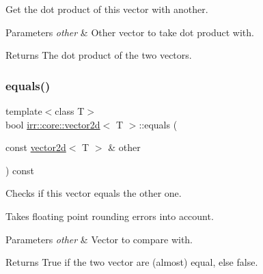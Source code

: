 Get the dot product of this vector with another. 


\begin{DoxyParams}{Parameters}
{\em other} & Other vector to take dot product with. \\
\hline
\end{DoxyParams}
\begin{DoxyReturn}{Returns}
The dot product of the two vectors. 
\end{DoxyReturn}
\mbox{\label{classirr_1_1core_1_1vector2d_a9b04601d982c880ed599b5bb16cd86a7}} 
\subsubsection{\texorpdfstring{equals()}{equals()}\hspace{0.1cm}{\footnotesize\ttfamily [1/2]}}
{\footnotesize\ttfamily template$<$class T$>$ \\
bool \hyperlink{classirr_1_1core_1_1vector2d}{irr\+::core\+::vector2d}$<$ T $>$\+::equals (\begin{DoxyParamCaption}\item[{const \hyperlink{classirr_1_1core_1_1vector2d}{vector2d}$<$ T $>$ \&}]{other }\end{DoxyParamCaption}) const\hspace{0.3cm}{\ttfamily [inline]}}



Checks if this vector equals the other one. 

Takes floating point rounding errors into account. 
\begin{DoxyParams}{Parameters}
{\em other} & Vector to compare with. \\
\hline
\end{DoxyParams}
\begin{DoxyReturn}{Returns}
True if the two vector are (almost) equal, else false. 
\end{DoxyReturn}
\mbox{\label{classirr_1_1core_1_1vector2d_a9b04601d982c880ed599b5bb16cd86a7}} 
